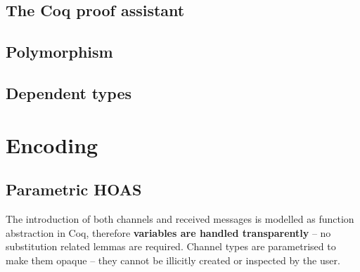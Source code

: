 \documentclass{mproj}
\begin{document}
\section{The Coq proof assistant}\label{coq}


\section{Polymorphism}\label{polymorphism}

\cite{Wadler1989}

\section{Dependent types}\label{dependent-types}

\chapter{Encoding}\label{encoding}

\section{Parametric HOAS}\label{phoas}

\cite{Wadler1989}
\cite{Chlipala2008}

The introduction of both channels and received messages is modelled as function
abstraction in Coq, therefore \textbf{variables are handled transparently} -- no
substitution related lemmas are required. Channel types are parametrised to make
them opaque -- they cannot be illicitly created or inspected by the user.
\end{document}
